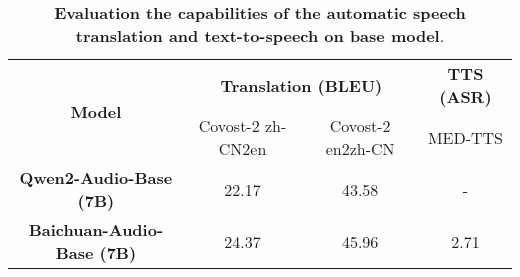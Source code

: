\begin{table}[htbp]
\caption{\textbf{Evaluation the capabilities of the automatic speech translation and text-to-speech on base model}.}
\centering
\begin{tabular}{cccc}
\toprule
\multirow{2}{*}{\textbf{Model}} & \multicolumn{2}{c}{\textbf{Translation (BLEU)}} & \textbf{TTS (ASR)} \\
\cmidrule(lr){2-3} \cmidrule(lr){4-4}
 & Covost-2 zh-CN2en & Covost-2 en2zh-CN & MED-TTS \\
\midrule
\textbf{Qwen2-Audio-Base (7B)} & 22.17 & 43.58 & - \\
\textbf{Baichuan-Audio-Base (7B)} & 24.37 & 45.96 & 2.71 \\
\bottomrule
\end{tabular}
\label{tab:bleu-tts}
\end{table}